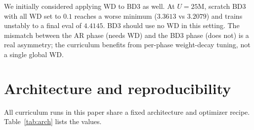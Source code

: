 \documentclass{article}
\begin{document}
We initially considered applying WD to BD3 as well. At $U{=}25$M, scratch BD3 with all WD set to $0.1$ reaches a worse minimum ($3.3613$ vs $3.2079$) and trains unstably to a final eval of $4.4145$. BD3 should use no WD in this setting. The mismatch between the AR phase (needs WD) and the BD3 phase (does not) is a real asymmetry; the curriculum benefits from per-phase weight-decay tuning, not a single global WD.

\section{Architecture and reproducibility}
\label{app:repro}

All curriculum runs in this paper share a fixed architecture and optimizer recipe. Table~\ref{tab:arch} lists the values.
\end{document}
